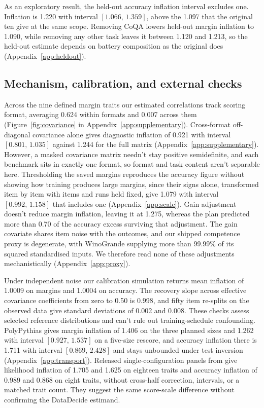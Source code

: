 \documentclass{article}
\newcommand{\ci}[2]{\ensuremath{[#1,\,#2]}}
\begin{document}
As an exploratory result, the held-out accuracy inflation interval excludes one. Inflation is 1.220 with interval \ci{1.066}{1.359}, above the 1.097 that the original ten give at the same scope. Removing CoQA lowers held-out margin inflation to 1.090, while removing any other task leaves it between 1.120 and 1.213, so the held-out estimate depends on battery composition as the original does (Appendix~\ref{app:heldout}).

\subsection{Mechanism, calibration, and external checks}
Across the nine defined margin traits our estimated correlations track scoring format, averaging 0.624 within formats and 0.007 across them (Figure~\ref{fig:covariance} in Appendix~\ref{app:supplementary}). Cross-format off-diagonal covariance alone gives diagnostic inflation of 0.921 with interval \ci{0.801}{1.035} against 1.244 for the full matrix (Appendix~\ref{app:supplementary}). However, a masked covariance matrix needn't stay positive semidefinite, and each benchmark sits in exactly one format, so format and task content aren't separable here. Thresholding the saved margins reproduces the accuracy figure without showing how training produces large margins, since their signs alone, transformed item by item with items and runs held fixed, give 1.079 with interval \ci{0.992}{1.158} that includes one (Appendix~\ref{app:scale}). Gain adjustment doesn't reduce margin inflation, leaving it at 1.275, whereas the plan predicted more than 0.70 of the accuracy excess surviving that adjustment. The gain covariate shares item noise with the outcomes, and our shipped competence proxy is degenerate, with WinoGrande supplying more than 99.99\% of its squared standardised inputs. We therefore read none of these adjustments mechanistically (Appendix~\ref{app:proxy}).

Under independent noise our calibration simulation returns mean inflation of 1.0009 on margins and 1.0004 on accuracy. The recovery slope across effective covariance coefficients from zero to 0.50 is 0.998, and fifty item re-splits on the observed data give standard deviations of 0.002 and 0.008. These checks assess selected reference distributions and can't rule out training-schedule confounding. PolyPythias gives margin inflation of 1.406 on the three planned sizes and 1.262 with interval \ci{0.927}{1.537} on a five-size rescore, and accuracy inflation there is 1.711 with interval \ci{0.869}{2.428} and stays unbounded under test inversion (Appendix~\ref{app:transport}). Released single-configuration panels from \citet{heineman2025} give likelihood inflation of 1.705 and 1.625 on eighteen traits and accuracy inflation of 0.989 and 0.868 on eight traits, without cross-half correction, intervals, or a matched trait count. They suggest the same score-scale difference without confirming the DataDecide estimand.
\end{document}
